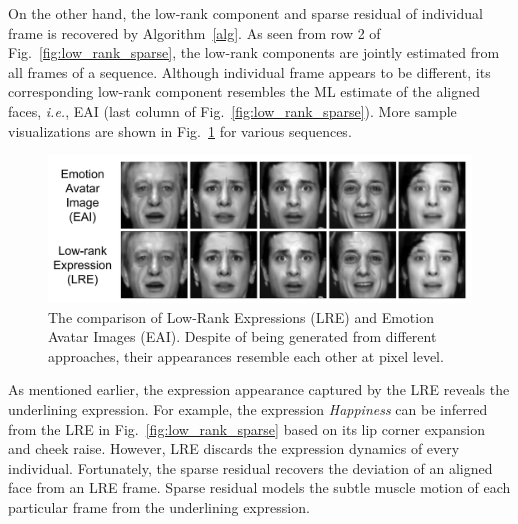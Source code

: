 \documentclass[journal]{IEEEtran}
\begin{document}
On the other hand, the low-rank component and sparse residual of individual frame is recovered by Algorithm~\ref{alg}. As seen from row 2 of Fig.~\ref{fig:low_rank_sparse}, the low-rank components are jointly estimated from all frames of a sequence. Although individual frame appears to be different, its corresponding low-rank component resembles the ML estimate of the aligned faces, \textit{i.e.}, EAI (last column of Fig.~\ref{fig:low_rank_sparse}). More sample visualizations are shown in Fig.~\ref{fig:eai_lre_compare} for various sequences. 


\begin{figure}[htbp]
	\centering
		\includegraphics[width=\columnwidth]{pics/eai_lre_compare.png}
	\caption{The comparison of Low-Rank Expressions (LRE) and Emotion Avatar Images (EAI). Despite of being generated from different approaches, their appearances resemble each other at pixel level.}
	\label{fig:eai_lre_compare}
\end{figure}

As mentioned earlier, the expression appearance captured by the LRE reveals the underlining expression. For example, the expression \textit{Happiness} can be inferred from the LRE in Fig.~\ref{fig:low_rank_sparse} based on its lip corner expansion and cheek raise. However, LRE discards the expression dynamics of every individual. Fortunately, the sparse residual recovers the deviation of an aligned face from an LRE frame. Sparse residual models the subtle muscle motion of each particular frame from the underlining expression. 
\end{document}
